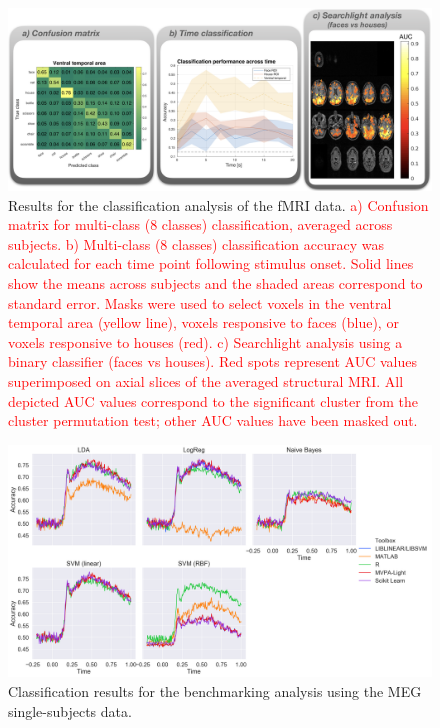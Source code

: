 \documentclass[utf8]{frontiersSCNS} %
\newcommand{\red}[1]{\textcolor{red}{#1}}
\begin{document}
\begin{figure}[ht!]
\centering\includegraphics[width=\linewidth]{fmri_results}
\caption{Results for the classification analysis of the \cite{Haxby2001} fMRI data. \red{a) Confusion matrix for multi-class (8 classes) classification, averaged across subjects. b) Multi-class (8 classes) classification accuracy was calculated for each time point following stimulus onset. Solid lines show the means across subjects and the shaded areas correspond to standard error. Masks were used to select voxels in the ventral temporal area (yellow line), voxels responsive to faces (blue), or voxels responsive to houses (red). c) Searchlight analysis using a binary classifier (faces vs houses). Red spots represent AUC values superimposed on axial slices of the averaged structural MRI. All depicted AUC values correspond to the significant cluster from the cluster permutation test; other AUC values have been masked out. }}\label{fig:fmri_results}
\end{figure}

\begin{figure}[ht!]
\centering\includegraphics[width=\linewidth]{benchmark_classification}
\caption{Classification results for the benchmarking analysis using the MEG single-subjects data.}\label{fig:benchmarking}
\end{figure}
\end{document}
